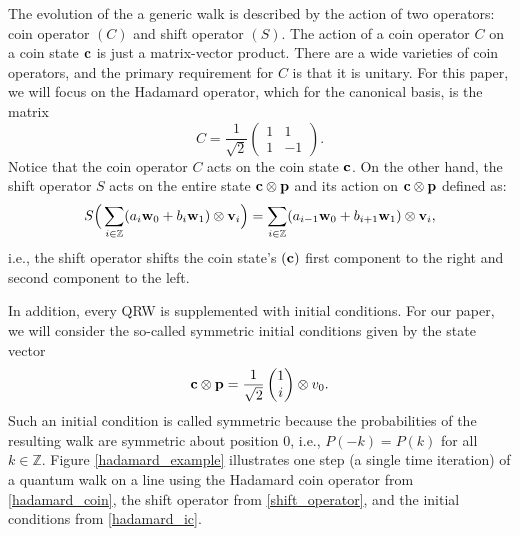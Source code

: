 \documentclass{siamart1116}
\begin{document}
The evolution of the a generic walk is described 
by the action of two operators: coin operator $(C)$ and shift operator $(S)$. The action of a coin 
operator $C$ on a coin state ${\bf c}$ is just a matrix-vector product. There are a wide varieties of 
coin operators, and the primary requirement for $C$ is that it is unitary. For this paper, we will focus 
on the Hadamard operator, which for the canonical basis, is the matrix
\begin{equation} \label{hadamard_coin}
C = \frac{1}{\sqrt{2}}\begin{pmatrix} 1 & 1\\
						      1 & -1
				    \end{pmatrix}.
\end{equation}
Notice that the coin operator $C$ acts on the coin state ${\bf c}$. On the other hand, the shift 
operator $S$ acts on the entire state ${\bf c}\otimes{\bf p}$ and its action on 
${\bf c}\otimes{\bf p}$ defined as:
\begin{equation} \label{shift_operator}
S\Big(\sum_{i\in\mathbb{Z}}(a_i{\bf w}_0+b_i{\bf w}_1)\otimes{\bf v}_i\Big) = \sum_{i\in\mathbb{Z}}(a_{i-1}{\bf w}_0+b_{i+1}{\bf w}_1)\otimes{\bf v}_i , 
\end{equation}
i.e., the shift operator shifts the coin state's $({\bf c})$ first component to the right and 
second component to the left.

In addition, every QRW is supplemented with initial conditions. For our paper, we will
consider the so-called symmetric initial conditions given by the state vector
\begin{equation} \label{hadamard_ic}
{\bf c}\otimes{\bf p} = \frac{1}{\sqrt{2}}\begin{pmatrix} 1 \\ i \end{pmatrix} \otimes v_0.
\end{equation}
Such an initial condition is called symmetric because the probabilities of the 
resulting walk  are symmetric about position 0, i.e.,  $P(-k) = P(k)$ for all 
$k \in \mathbb{Z}$.
Figure \ref{hadamard_example} illustrates one step (a single time iteration) of a 
quantum walk on a line using the Hadamard coin operator from \eqref{hadamard_coin}, the 
shift operator from \eqref{shift_operator}, and the initial conditions from 
\eqref{hadamard_ic}.
\end{document}
